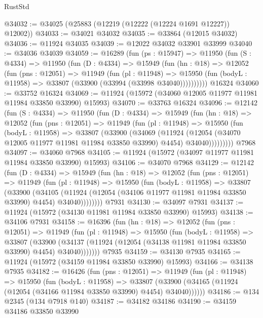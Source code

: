 \begin{lexlean}{RustStd}
\begin{coremodule}
{\begin{coremodule}
{{{{{{{{{{{{{{{{{{{{{{{{{{{{{{{{{{{{{{{{{{{{{{{{{{{{{{{{{{{{{{{{{{{{{{{{{{{{{{{{@34032 := @34025 (@25883 (@12219 (@12222 (@12224 @1691 @12227)) @12002))
@34033 := @34021 @34032
@34035 := @33864 (@12015 @34032)
@34036 := @11924 @34035
@34039 := @12022 @34032 @33901 @33999
@34040 := @34036 @34039
@34059 := @16289
    (fun (ps : @15947) =>
    @11950
      (fun (S : @4334) =>
      @11950
        (fun (D : @4334) =>
        @15949
          (fun (hn : @18) =>
          @12052
            (fun (pns : @12051) =>
            @11949
              (fun (pl : @11948) =>
              @15950 (fun (bodyL : @11958) => @33807 (@33900 (@33994 (@33998 @34040))))))))))
    @16324
@34060 := @33752 @16324
@34069 := @11924 (@15972 (@34060 @12005 @11977 @11981 @11984 @33850 @33990) @15993)
@34070 := @33763 @16324
@34096 := @12142
    (fun (S : @4334) =>
    @11950
      (fun (D : @4334) =>
      @15949
        (fun (hn : @18) =>
        @12052
          (fun (pns : @12051) =>
          @11949
            (fun (pl : @11948) =>
            @15950
              (fun (bodyL : @11958) =>
              @33807
                (@33900
                  (@34069
                    (@11924
                      (@12054 (@34070 @12005 @11977 @11981 @11984 @33850 @33990) @4454)
                      @34040)))))))))
    @7968
@34097 := @34060 @7968
@34105 := @11924 (@15972 (@34097 @11977 @11981 @11984 @33850 @33990) @15993)
@34106 := @34070 @7968
@34129 := @12142
    (fun (D : @4334) =>
    @15949
      (fun (hn : @18) =>
      @12052
        (fun (pns : @12051) =>
        @11949
          (fun (pl : @11948) =>
          @15950
            (fun (bodyL : @11958) =>
            @33807
              (@33900
                (@34105
                  (@11924 (@12054 (@34106 @11977 @11981 @11984 @33850 @33990) @4454) @34040))))))))
    @7931
@34130 := @34097 @7931
@34137 := @11924 (@15972 (@34130 @11981 @11984 @33850 @33990) @15993)
@34138 := @34106 @7931
@34158 := @16396
    (fun (hn : @18) =>
    @12052
      (fun (pns : @12051) =>
      @11949
        (fun (pl : @11948) =>
        @15950
          (fun (bodyL : @11958) =>
          @33807
            (@33900
              (@34137 (@11924 (@12054 (@34138 @11981 @11984 @33850 @33990) @4454) @34040)))))))
    @7935
@34159 := @34130 @7935
@34165 := @11924 (@15972 (@34159 @11984 @33850 @33990) @15993)
@34166 := @34138 @7935
@34182 := @16426
    (fun (pns : @12051) =>
    @11949
      (fun (pl : @11948) =>
      @15950
        (fun (bodyL : @11958) =>
        @33807 (@33900 (@34165 (@11924 (@12054 (@34166 @11984 @33850 @33990) @4454) @34040))))))
@34186 := @134 @2345 (@134 @7918 @140)
@34187 := @34182 @34186
@34190 := @34159 @34186 @33850 @33990
}}}}}}}}}}}}}}}}}}}}}}}}}}}}}}}}}}}}}}}}}}}}}}}}}}}}}}}}}}}}}}}}}}}}}}}}}}}}}}}}
\end{coremodule}}
\end{coremodule}
\end{lexlean}
